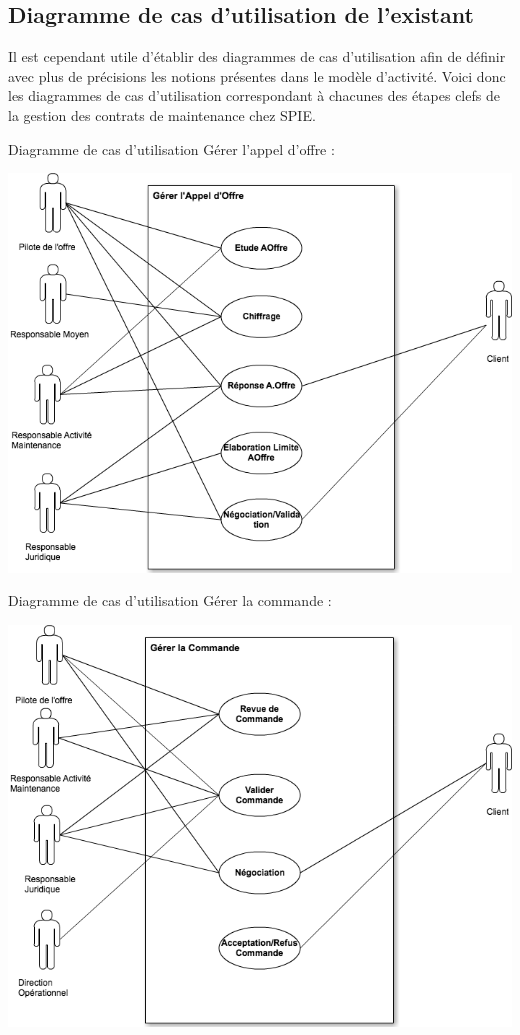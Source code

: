 \subsection{Diagramme de cas d'utilisation de l'existant}

Il est cependant utile d'établir des diagrammes de cas d'utilisation afin de définir avec plus de précisions les notions présentes dans le modèle d'activité. Voici donc les diagrammes de cas d'utilisation correspondant à chacunes des étapes clefs de la gestion des contrats de maintenance chez SPIE.

Diagramme de cas d'utilisation Gérer l'appel d'offre :
\begin {center}
\includegraphics[width=\textwidth]{png_generaux/DCUAppelOffre.png}
\end {center}

Diagramme de cas d'utilisation Gérer la commande :
\begin {center}
\includegraphics[width=\textwidth]{png_generaux/DCUGererCommande.png}
\end {center}


